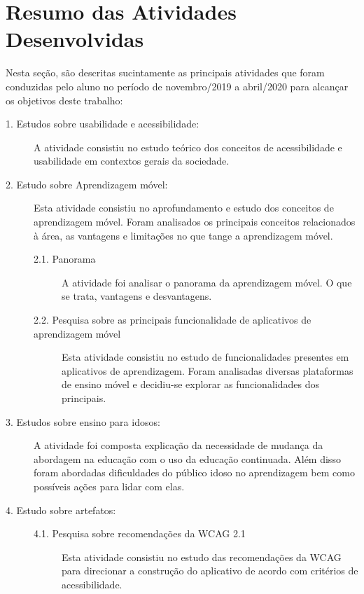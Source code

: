 \chapter{Resumo das Atividades Desenvolvidas} \label{sec:resumo_ativ}
Nesta seção, são descritas sucintamente as principais atividades que foram conduzidas pelo aluno no período de novembro/2019 a abril/2020 para alcançar os objetivos deste trabalho:

\begin{description}
\item[1. Estudos sobre usabilidade e acessibilidade:]
A atividade consistiu no estudo teórico dos conceitos de acessibilidade e usabilidade em contextos gerais da sociedade.

\item[2. Estudo sobre Aprendizagem móvel:] Esta atividade consistiu no aprofundamento e estudo dos conceitos de aprendizagem móvel. Foram analisados os principais conceitos relacionados à área, as vantagens e limitações no que tange a aprendizagem móvel. 

\begin{description}
    \item[2.1. Panorama]
    A atividade foi analisar o panorama da aprendizagem móvel. O que se trata, vantagens e desvantagens.
    
    \item[2.2. Pesquisa sobre as principais funcionalidade de aplicativos de aprendizagem móvel]
    Esta atividade consistiu no estudo de funcionalidades presentes em aplicativos de aprendizagem. Foram analisadas diversas plataformas de ensino móvel e decidiu-se explorar as funcionalidades dos principais.
\end{description}

\item[3. Estudos sobre ensino para idosos:]
A atividade foi composta explicação da necessidade de mudança da abordagem na educação com o uso da educação continuada. Além disso foram abordadas dificuldades do público idoso no aprendizagem bem como possíveis ações para lidar com elas.

\item[4. Estudo sobre artefatos:]
\hfill

\begin{description}
    \item[4.1. Pesquisa sobre recomendações da WCAG 2.1]
    Esta atividade consistiu no estudo das recomendações da WCAG para direcionar a construção do aplicativo de acordo com critérios de acessibilidade.
    

\end{description}
\end{description}
